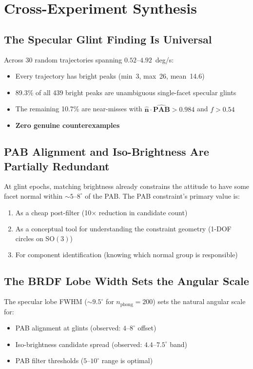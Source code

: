 \documentclass[11pt,a4paper]{article}
\begin{document}
\section{Cross-Experiment Synthesis}

\subsection{The Specular Glint Finding Is Universal}

Across 30 random trajectories spanning $0.52$--$4.92$~deg/s:
\begin{itemize}[leftmargin=2em]
  \item Every trajectory has bright peaks (min~3, max~26, mean~14.6)
  \item 89.3\% of all 439 bright peaks are unambiguous single-facet specular glints
  \item The remaining 10.7\% are near-misses with $\hat{\mathbf{n}}\cdot\hat{\mathbf{PAB}} > 0.984$ and $f > 0.54$
  \item \textbf{Zero genuine counterexamples}
\end{itemize}

\subsection{PAB Alignment and Iso-Brightness Are Partially Redundant}

At glint epochs, matching brightness already constrains the attitude to have some facet normal within ${\sim}5$--$8^\circ$ of the PAB. The PAB constraint's primary value is:
\begin{enumerate}[leftmargin=2em]
  \item As a cheap post-filter (10$\times$ reduction in candidate count)
  \item As a conceptual tool for understanding the constraint geometry (1-DOF circles on $\mathrm{SO}(3)$)
  \item For component identification (knowing which normal group is responsible)
\end{enumerate}

\subsection{The BRDF Lobe Width Sets the Angular Scale}

The specular lobe FWHM (${\sim}9.5^\circ$ for $n_{\mathrm{phong}} = 200$) sets the natural angular scale for:
\begin{itemize}[leftmargin=2em]
  \item PAB alignment at glints (observed: $4$--$8^\circ$ offset)
  \item Iso-brightness candidate spread (observed: $4.4$--$7.5^\circ$ band)
  \item PAB filter thresholds ($5$--$10^\circ$ range is optimal)
\end{itemize}
\end{document}
